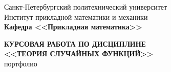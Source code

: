 \begin{titlepage}
\begin{center}
	\begin{large}
		Санкт-Петербургский политехнический университет\\
		Институт прикладной математики и механики\\
		\textbf{Кафедра <<Прикладная математика>>}\\
	\end{large}
	\vfill
	\Large{\textbf{КУРСОВАЯ РАБОТА ПО ДИСЦИПЛИНЕ \\
			 <<ТЕОРИЯ СЛУЧАЙНЫХ ФУНКЦИЙ>>}}\\
     \large{портфолио}
\end{center}
\vfill
{}
\end{titlepage}
